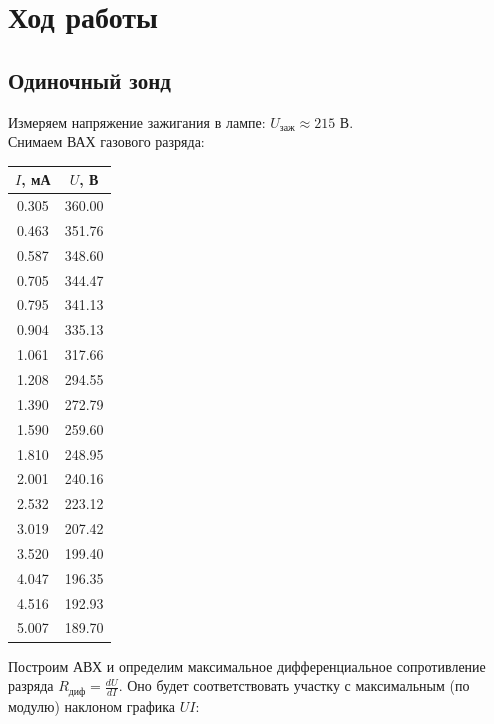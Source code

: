 \documentclass{lab}
\begin{document}
\section*{Ход работы}
\subsection{Одиночный зонд}
Измеряем напряжение зажигания в лампе: $U_{\text{заж}} \approx 215 $ В.\\
Снимаем ВАХ газового разряда:
\begin{table}[H]
    \centering
    \begin{tabular}{|c|c|}
        \hline
        $I$, мА & $U$, В \\\hline
        0.305 & 360.00 \\ \hline
        0.463 & 351.76 \\ \hline
        0.587 & 348.60 \\ \hline
        0.705 & 344.47 \\ \hline
        0.795 & 341.13 \\ \hline
        0.904 & 335.13 \\ \hline
        1.061 & 317.66 \\ \hline
        1.208 & 294.55 \\ \hline
        1.390 & 272.79 \\ \hline
        1.590 & 259.60 \\ \hline
        1.810 & 248.95 \\ \hline
        2.001 & 240.16 \\ \hline
        2.532 & 223.12 \\ \hline
        3.019 & 207.42 \\ \hline
        3.520 & 199.40 \\ \hline
        4.047 & 196.35 \\ \hline
        4.516 & 192.93 \\ \hline
        5.007 & 189.70 \\ \hline
    \end{tabular}
\end{table}

Построим АВХ и определим максимальное дифференциальное сопротивление разряда $R_{\text{диф}} = \frac{dU}{dI}$. Оно будет соответствовать участку с максимальным (по модулю) наклоном графика $U{I}$:
\end{document}
